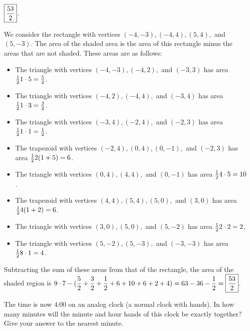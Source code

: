 \documentclass[11pt]{article}
\DeclareRobustCommand{\frac}[3][0pt]{%
  {\begingroup\hspace{#1}#2\hspace{#1}\endgroup\over\hspace{#1}#3\hspace{#1}}}
\begin{document}
\begin{answer} $\boxed{\displaystyle \frac{53}{2}}$. \end{answer}
\begin{solution}
We consider the rectangle with vertices $(-4, -3), (-4, 4), (5, 4),$ and $(5, -3)$. The area of the shaded area is the area of this rectangle minus the areas that are not shaded. These areas are as follows:
\begin{itemize}
	\item The triangle with vertices $(-4, -3), (-4, 2),$ and $(-3, 3)$ has area $\frac{1}{2} 1 \cdot 5 = \frac{5}{2}$.
	\item The triangle with vertices $(-4, 2), (-4, 4),$ and $(-3, 4)$ has area $\frac{1}{2} 1 \cdot 3 = \frac{3}{2}$.
	\item The triangle with vertices $(-3, 4), (-2, 4),$ and $(-2, 3)$ has area $\frac{1}{2} 1 \cdot 1 = \frac{1}{2}$.
	\item The trapezoid with vertices $(-2, 4), (0, 4), (0, -1),$ and $(-2, 3)$ has area $\frac{1}{2} 2(1 + 5) = 6$.
	\item The triangle with vertices $(0, 4), (4, 4),$ and $(0, -1)$ has area $\frac{1}{2} 4 \cdot 5 = 10$.
	\item The trapezoid with vertices $(4, 4), (5, 4), (5, 0),$ and $(3, 0)$ has area $\frac{1}{2} 	4(1+2) = 6$.
	\item The triangle with vertices $(3, 0), (5, 0),$ and $(5, -2)$ has area $\frac{1}{2} 2 \cdot 2 = 2$,
	\item The triangle with vertices $(5, -2), (5, -3),$ and $(-3, -3)$ has area $\frac{1}{2} 8 \cdot 1 = 4$.
\end{itemize}
Subtracting the sum of these areas from that of the rectangle, the area of the shaded region is $\displaystyle 9 \cdot 7 - (\frac{5}{2} + \frac{3}{2} + \frac{1}{2} + 6 + 10 + 6 + 2 + 4) = 63 - 36 - \frac{1}{2} =\boxed{\frac{53}{2}}$.
\end{solution}

\begin{problem}The time is now 4:00 on an analog clock (a normal clock with hands). In how many minutes will the minute and hour hands of this clock be exactly together? Give your answer to the nearest minute. %
\end{problem}
\end{document}
